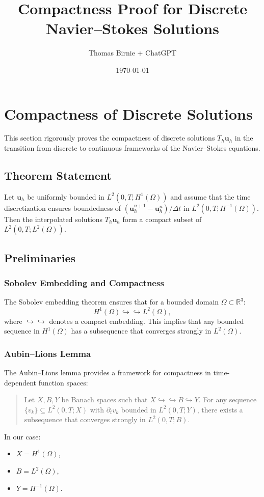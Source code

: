 \documentclass[12pt]{article}
\title{Compactness Proof for Discrete Navier--Stokes Solutions}
\author{Thomas Birnie + ChatGPT}
\date{\today}
\begin{document}
\maketitle

\section{Compactness of Discrete Solutions}

This section rigorously proves the compactness of discrete solutions $T_h \mathbf{u}_h$ in the transition from discrete to continuous frameworks of the Navier--Stokes equations.

\subsection{Theorem Statement}

\begin{theorem}[Compactness]
Let $\mathbf{u}_h$ be uniformly bounded in $L^2(0,T; H^1(\Omega))$ and assume that the time discretization ensures boundedness of $(\mathbf{u}_h^{n+1} - \mathbf{u}_h^n)/\Delta t$ in $L^2(0,T; H^{-1}(\Omega))$. Then the interpolated solutions $T_h \mathbf{u}_h$ form a compact subset of $L^2(0,T; L^2(\Omega))$.
\end{theorem}

\subsection{Preliminaries}

\subsubsection{Sobolev Embedding and Compactness}
The Sobolev embedding theorem ensures that for a bounded domain $\Omega \subset \mathbb{R}^3$:
\begin{equation}
H^1(\Omega) \hookrightarrow\hookrightarrow L^2(\Omega),
\end{equation}
where $\hookrightarrow\hookrightarrow$ denotes a compact embedding. This implies that any bounded sequence in $H^1(\Omega)$ has a subsequence that converges strongly in $L^2(\Omega)$.

\subsubsection{Aubin--Lions Lemma}
The Aubin--Lions lemma provides a framework for compactness in time-dependent function spaces:
\begin{quote}
Let $X, B, Y$ be Banach spaces such that $X \hookrightarrow\hookrightarrow B \hookrightarrow Y$. For any sequence $\{v_k\} \subseteq L^2(0,T; X)$ with $\partial_t v_k$ bounded in $L^2(0,T; Y)$, there exists a subsequence that converges strongly in $L^2(0,T; B)$.
\end{quote}
In our case:
\begin{itemize}
    \item $X = H^1(\Omega)$,
    \item $B = L^2(\Omega)$,
    \item $Y = H^{-1}(\Omega)$.
\end{itemize}
\end{document}
